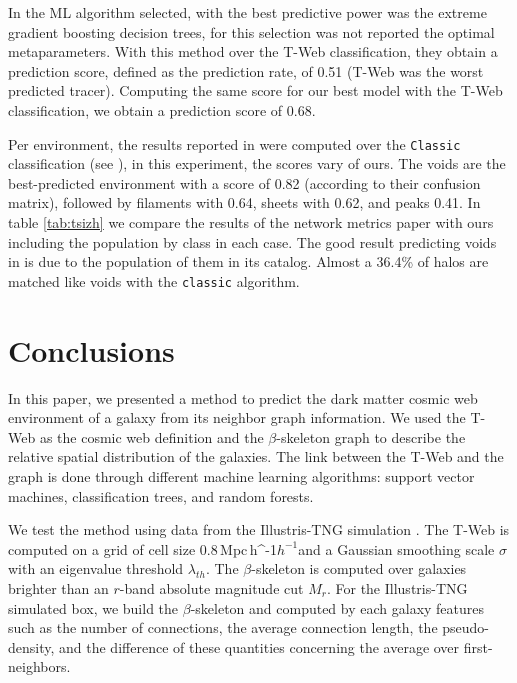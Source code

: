 \documentclass[usenatbib]{mnras}
\newcommand{\Mpch}{\,{\rm Mpc}\,\ifmmode h^{-1}\else $h^{-1}$\fi}
\begin{document}
In \cite{Tsizh2019} the ML algorithm selected, with the best
predictive power was the extreme gradient boosting decision trees, for
this selection was not reported the optimal metaparameters. With this
method over the T-Web classification, they obtain a prediction score,
defined as the prediction rate, of 0.51 (T-Web was the worst predicted
tracer). Computing the same score for our best model with the T-Web
classification, we obtain a prediction score of 0.68. 

Per environment, the results reported in \cite{Tsizh2019} were
computed over the \texttt{Classic} classification (see
\cite{Libeskind2018}), in this experiment, the scores vary of
ours. The voids are the best-predicted environment with a score of
0.82 (according to their confusion matrix), followed by filaments with
0.64, sheets with 0.62, and peaks 0.41. In table \ref{tab:tsizh} we
compare the results of the network metrics paper with ours including
the population by class in each case. The good result predicting voids
in \cite{Tsizh2019} is due to the population of them in its
catalog. Almost a 36.4\% of halos are matched like voids with the
\texttt{classic} algorithm.  


\section{Conclusions}\label{sec:conclusions}

In this paper, we presented a method to predict the dark matter cosmic web environment of a galaxy from its neighbor graph information.
We used the T-Web as the cosmic web definition \citep{Forero-Romero2009} and the $\beta$-skeleton graph \citep{Fang2019} 
to describe the relative spatial distribution of the galaxies. 
The link between the T-Web and the graph is done through different
machine learning algorithms: support vector machines, classification trees, and random forests.

We test the method using data from the Illustris-TNG simulation \cite{Nelson2015}. The T-Web is computed on a grid of cell size $0.8$\Mpch and a Gaussian smoothing scale $\sigma$ with an eigenvalue threshold $\lambda_{th}$. The $\beta$-skeleton is computed over galaxies brighter than an $r$-band absolute magnitude cut $M_{r}$.
For the Illustris-TNG simulated box, we build the $\beta$-skeleton and computed by each galaxy features such as the number of connections, the average connection length, the pseudo-density, and the difference of these quantities concerning the average over first-neighbors.
\end{document}
